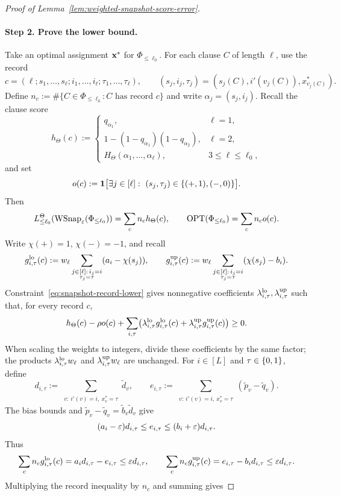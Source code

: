 \begin{proof}[Proof of Lemma~\ref{lem:weighted-snapshot-score-error}]
\paragraph{Step 2. Prove the lower bound.}
Take an optimal assignment $\mathbf{x}^*$ for $\Phi_{\le\ell_0}$.
For each clause $C$ of length $\ell$, use the record
\[
  c=(\ell;s_1,\ldots,s_\ell;i_1,\ldots,i_\ell;\tau_1,\ldots,\tau_\ell),
  \qquad (s_j,i_j,\tau_j)=(s_j(C),i'(v_j(C)),x^*_{v_j(C)}).
\]
Define $n_c:=\#\{C\in\Phi_{\le\ell_0}:C\text{ has record }c\}$ and write $\alpha_j=(s_j,i_j)$. Recall the clause score
\[
  h_\Theta(c):=\begin{cases}
    q_{\alpha_1},&\ell=1,\\
    1-(1-q_{\alpha_1})(1-q_{\alpha_2}),&\ell=2,\\
    H_\Theta(\alpha_1,\ldots,\alpha_\ell),&3\le\ell\le\ell_0,
  \end{cases}
\]
and set
\[
  o(c):=\1\bigl[\exists j\in[\ell]:\ (s_j,\tau_j)\in\{(+,1),(-,0)\}\bigr].
\]
Then
\[
  L_{\le\ell_0}^\Theta(\operatorname{WSnap}_{\varepsilon}(\Phi_{\le\ell_0}))=\sum_c n_ch_\Theta(c),\qquad
  \operatorname{OPT}(\Phi_{\le\ell_0})=\sum_c n_co(c).
\]
Write $\chi(+)=1$, $\chi(-)=-1$, and recall
\[
  g^{\rm lo}_{i,\tau}(c):=
  w_\ell\sum_{\substack{j\in[\ell]:\,i_j=i\\ \tau_j=\tau}}(a_i-\chi(s_j)),
  \qquad
  g^{\rm up}_{i,\tau}(c):=
  w_\ell\sum_{\substack{j\in[\ell]:\,i_j=i\\ \tau_j=\tau}}(\chi(s_j)-b_i).
\]
Constraint~\eqref{eq:snapshot-record-lower} gives nonnegative coefficients $\lambda^{\rm lo}_{i,\tau},\lambda^{\rm up}_{i,\tau}$ such that, for every record $c$,
\[
  h_\Theta(c)-\rho o(c)
  +\sum_{i,\tau}\bigl(
    \lambda^{\rm lo}_{i,\tau}g^{\rm lo}_{i,\tau}(c)
    +\lambda^{\rm up}_{i,\tau}g^{\rm up}_{i,\tau}(c)\bigr)\ge0.
\]
When scaling the weights to integers, divide these coefficients by the same factor; the products $\lambda^{\rm lo}_{i,\tau}w_\ell$ and $\lambda^{\rm up}_{i,\tau}w_\ell$ are unchanged.
For $i\in[L]$ and $\tau\in\{0,1\}$, define
\[
  d_{i,\tau}:=\sum_{\substack{v:\,i'(v)=i,\ x_v^*=\tau}}\widetilde d_v,\qquad
  e_{i,\tau}:=\sum_{\substack{v:\,i'(v)=i,\ x_v^*=\tau}}(\widetilde p_v-\widetilde q_v).
\]
The bias bounds and $\widetilde p_v-\widetilde q_v=\widetilde b_v\widetilde d_v$ give
\[
  (a_i-\varepsilon)d_{i,\tau}\le e_{i,\tau}\le(b_i+\varepsilon)d_{i,\tau}.
\]
Thus
\[
  \sum_c n_cg^{\rm lo}_{i,\tau}(c)=a_id_{i,\tau}-e_{i,\tau}\le\varepsilon d_{i,\tau},\qquad
  \sum_c n_cg^{\rm up}_{i,\tau}(c)=e_{i,\tau}-b_id_{i,\tau}\le\varepsilon d_{i,\tau}.
\]
Multiplying the record inequality by $n_c$ and summing gives

\end{proof}
